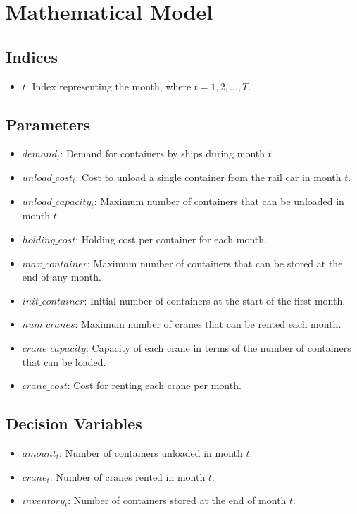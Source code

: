 \documentclass{article}
\begin{document}
\section*{Mathematical Model}

\subsection*{Indices}
\begin{itemize}
    \item $t$: Index representing the month, where $t = 1, 2, \ldots, T$.
\end{itemize}

\subsection*{Parameters}
\begin{itemize}
    \item $demand_t$: Demand for containers by ships during month $t$.
    \item $unload\_cost_t$: Cost to unload a single container from the rail car in month $t$.
    \item $unload\_capacity_t$: Maximum number of containers that can be unloaded in month $t$.
    \item $holding\_cost$: Holding cost per container for each month.
    \item $max\_container$: Maximum number of containers that can be stored at the end of any month.
    \item $init\_container$: Initial number of containers at the start of the first month.
    \item $num\_cranes$: Maximum number of cranes that can be rented each month.
    \item $crane\_capacity$: Capacity of each crane in terms of the number of containers that can be loaded.
    \item $crane\_cost$: Cost for renting each crane per month.
\end{itemize}

\subsection*{Decision Variables}
\begin{itemize}
    \item $amount_t$: Number of containers unloaded in month $t$.
    \item $crane_t$: Number of cranes rented in month $t$.
    \item $inventory_t$: Number of containers stored at the end of month $t$.
\end{itemize}
\end{document}
